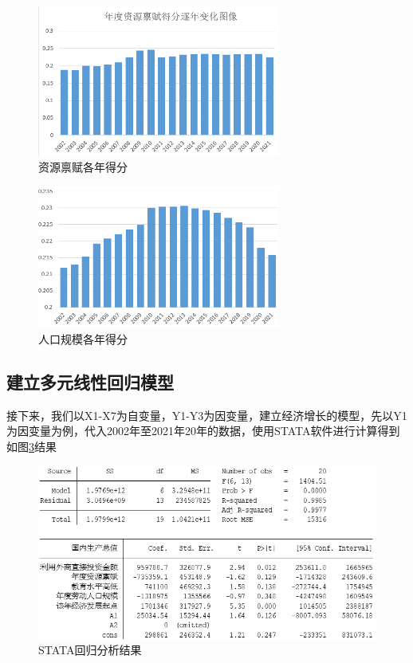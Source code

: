 \documentclass[UTF8]{article}
\begin{document}
	\newpage
	\begin{figure}[htb]
		\centering
		\includegraphics[width=8cm]{pictures/zybfdf.png}
		\caption{资源禀赋各年得分}
		\label{zybfdf}
	\end{figure}
	\begin{figure}[htb]
		\centering
		\includegraphics[width=8cm]{pictures/rkgmdf.png}
		\caption{人口规模各年得分}
		\label{rkgmdf}
	\end{figure}
	\subsection{建立多元线性回归模型}
	接下来，我们以X1-X7为自变量，Y1-Y3为因变量，建立经济增长的模型，先以Y1为因变量为例，代入2002年至2021年20年的数据，使用STATA软件进行计算得到如图\ref{y1}结果
	\newpage
	\begin{figure}[htb]
	\centering
	\includegraphics[width=12cm]{pictures/y1.png}
	\caption{STATA回归分析结果}
	\label{y1}
	\end{figure}
	\vspace{-10pt}
\end{document}
